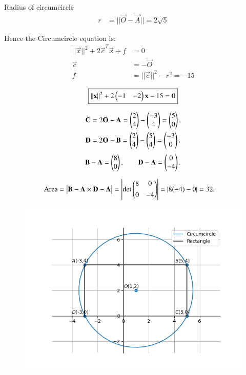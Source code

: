 \documentclass[journal]{article}
\begin{document}
Radius of circumcircle
\begin{align}
r&=||\vec{O}-\vec{A}||=2\sqrt{5}
\end{align}

Hence the Circumcircle equation is:
\begin{align}
||\vec{x}||^2+2\vec{c}^T\vec{x}+f&=0\\
\vec{c}&=-\vec{O}\\
f&=||\vec{c}||^2-r^2=-15
\end{align}
\begin{center}
\begin{align}
\boxed{||\mathbf{x}||^2+2\begin{pmatrix}-1 & -2\end{pmatrix}\mathbf{x}-15=0}
\end{align}
\end{center}
\begin{align}
\mathbf{C}&=2\mathbf{O}-\mathbf{A}=\begin{pmatrix}2\\4\end{pmatrix}-\begin{pmatrix}-3\\4\end{pmatrix}=\begin{pmatrix}5\\0\end{pmatrix},\\
\mathbf{D}&=2\mathbf{O}-\mathbf{B}=\begin{pmatrix}2\\4\end{pmatrix}-\begin{pmatrix}5\\4\end{pmatrix}=\begin{pmatrix}-3\\0\end{pmatrix}.
\end{align}
\begin{align}
\mathbf{B}-\mathbf{A}=\begin{pmatrix}8\\0\end{pmatrix},\qquad
\mathbf{D}-\mathbf{A}=\begin{pmatrix}0\\-4\end{pmatrix}.
\end{align}

\begin{align}
\text{Area} &= \big|\mathbf{B}-\mathbf{A}\times\mathbf{D}-\mathbf{A}\big|
= \left|\det\begin{pmatrix}8 & 0\\[4pt]0 & -4\end{pmatrix}\right|
= |8(-4)-0| = 32.
\end{align}
\newpage
\begin{figure}
    \centering
    \includegraphics[width=1.0\linewidth]{figs/fig1.png}
    \caption{}
    \label{fig:placeholder}
\end{figure}
\end{document}
